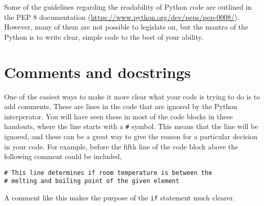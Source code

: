 \documentclass[a4paper]{article}
\begin{document}
Some of the guidelines regarding the readability of Python code are outlined in the PEP 8 documentation (\url{https://www.python.org/dev/peps/pep-0008/}).
However, many of them are not possible to legislate on, but the mantra of the Python is to write clear, simple code to the best of your ability.

\vspace{\baselineskip}
\begin{center}
	\noindent{}
\end{center}

\section{Comments and docstrings}
One of the easiest ways to make it more clear what your code is trying to do is to add comments.
These are lines in the code that are ignored by the Python interperator.
You will have seen these in most of the code blocks in these handouts, where the line starts with a \texttt{\#} symbol.
This means that the line will be ignored, and these can be a great way to give the reason for a particular decision in your code.
For example, before the fifth line of the code block above the following comment could be included,
\begin{lstlisting}
# This line determines if room temperature is between the
# melting and boiling point of the given element
\end{lstlisting}
A comment like this makes the purpose of the \texttt{if} statement much clearer.
\end{document}
